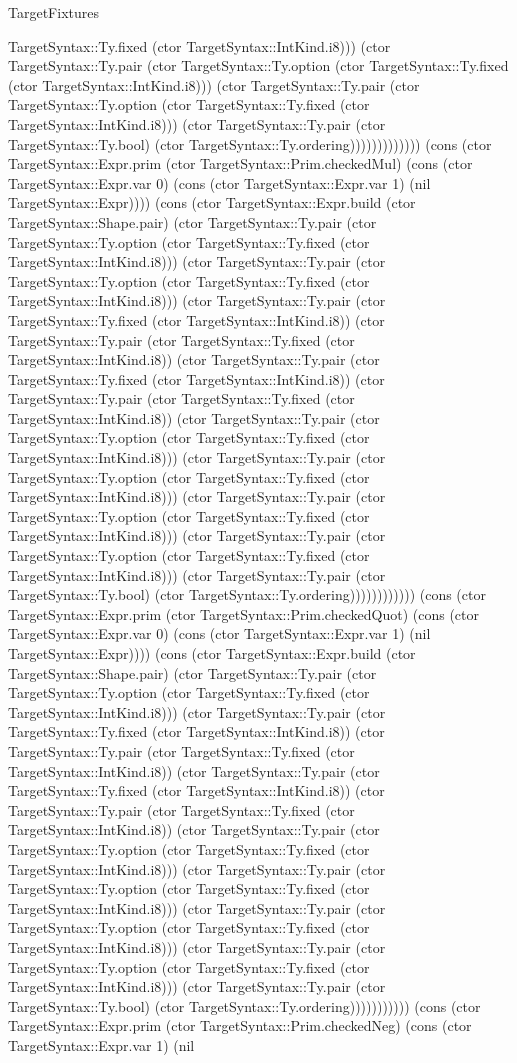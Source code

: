 \begin{lexlean}{TargetFixtures}
\begin{semanticmodule}
{TargetSyntax::Ty.fixed (ctor TargetSyntax::IntKind.i8))) (ctor TargetSyntax::Ty.pair (ctor TargetSyntax::Ty.option (ctor TargetSyntax::Ty.fixed (ctor TargetSyntax::IntKind.i8))) (ctor TargetSyntax::Ty.pair (ctor TargetSyntax::Ty.option (ctor TargetSyntax::Ty.fixed (ctor TargetSyntax::IntKind.i8))) (ctor TargetSyntax::Ty.pair (ctor TargetSyntax::Ty.bool) (ctor TargetSyntax::Ty.ordering))))))))))))) (cons (ctor TargetSyntax::Expr.prim (ctor TargetSyntax::Prim.checkedMul) (cons (ctor TargetSyntax::Expr.var 0) (cons (ctor TargetSyntax::Expr.var 1) (nil TargetSyntax::Expr)))) (cons (ctor TargetSyntax::Expr.build (ctor TargetSyntax::Shape.pair) (ctor TargetSyntax::Ty.pair (ctor TargetSyntax::Ty.option (ctor TargetSyntax::Ty.fixed (ctor TargetSyntax::IntKind.i8))) (ctor TargetSyntax::Ty.pair (ctor TargetSyntax::Ty.option (ctor TargetSyntax::Ty.fixed (ctor TargetSyntax::IntKind.i8))) (ctor TargetSyntax::Ty.pair (ctor TargetSyntax::Ty.fixed (ctor TargetSyntax::IntKind.i8)) (ctor TargetSyntax::Ty.pair (ctor TargetSyntax::Ty.fixed (ctor TargetSyntax::IntKind.i8)) (ctor TargetSyntax::Ty.pair (ctor TargetSyntax::Ty.fixed (ctor TargetSyntax::IntKind.i8)) (ctor TargetSyntax::Ty.pair (ctor TargetSyntax::Ty.fixed (ctor TargetSyntax::IntKind.i8)) (ctor TargetSyntax::Ty.pair (ctor TargetSyntax::Ty.option (ctor TargetSyntax::Ty.fixed (ctor TargetSyntax::IntKind.i8))) (ctor TargetSyntax::Ty.pair (ctor TargetSyntax::Ty.option (ctor TargetSyntax::Ty.fixed (ctor TargetSyntax::IntKind.i8))) (ctor TargetSyntax::Ty.pair (ctor TargetSyntax::Ty.option (ctor TargetSyntax::Ty.fixed (ctor TargetSyntax::IntKind.i8))) (ctor TargetSyntax::Ty.pair (ctor TargetSyntax::Ty.option (ctor TargetSyntax::Ty.fixed (ctor TargetSyntax::IntKind.i8))) (ctor TargetSyntax::Ty.pair (ctor TargetSyntax::Ty.bool) (ctor TargetSyntax::Ty.ordering)))))))))))) (cons (ctor TargetSyntax::Expr.prim (ctor TargetSyntax::Prim.checkedQuot) (cons (ctor TargetSyntax::Expr.var 0) (cons (ctor TargetSyntax::Expr.var 1) (nil TargetSyntax::Expr)))) (cons (ctor TargetSyntax::Expr.build (ctor TargetSyntax::Shape.pair) (ctor TargetSyntax::Ty.pair (ctor TargetSyntax::Ty.option (ctor TargetSyntax::Ty.fixed (ctor TargetSyntax::IntKind.i8))) (ctor TargetSyntax::Ty.pair (ctor TargetSyntax::Ty.fixed (ctor TargetSyntax::IntKind.i8)) (ctor TargetSyntax::Ty.pair (ctor TargetSyntax::Ty.fixed (ctor TargetSyntax::IntKind.i8)) (ctor TargetSyntax::Ty.pair (ctor TargetSyntax::Ty.fixed (ctor TargetSyntax::IntKind.i8)) (ctor TargetSyntax::Ty.pair (ctor TargetSyntax::Ty.fixed (ctor TargetSyntax::IntKind.i8)) (ctor TargetSyntax::Ty.pair (ctor TargetSyntax::Ty.option (ctor TargetSyntax::Ty.fixed (ctor TargetSyntax::IntKind.i8))) (ctor TargetSyntax::Ty.pair (ctor TargetSyntax::Ty.option (ctor TargetSyntax::Ty.fixed (ctor TargetSyntax::IntKind.i8))) (ctor TargetSyntax::Ty.pair (ctor TargetSyntax::Ty.option (ctor TargetSyntax::Ty.fixed (ctor TargetSyntax::IntKind.i8))) (ctor TargetSyntax::Ty.pair (ctor TargetSyntax::Ty.option (ctor TargetSyntax::Ty.fixed (ctor TargetSyntax::IntKind.i8))) (ctor TargetSyntax::Ty.pair (ctor TargetSyntax::Ty.bool) (ctor TargetSyntax::Ty.ordering))))))))))) (cons (ctor TargetSyntax::Expr.prim (ctor TargetSyntax::Prim.checkedNeg) (cons (ctor TargetSyntax::Expr.var 1) (nil }
\end{semanticmodule}
\end{lexlean}
